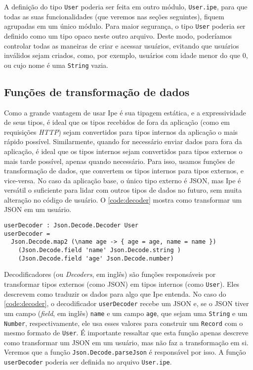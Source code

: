 A definição do tipo \texttt{User} poderia ser feita em outro módulo, \texttt{User.ipe}, para que todas
as suas funcionalidades (que veremos nas seções seguintes), fiquem agrupadas em um único módulo. Para
maior segurança, o tipo \texttt{User} poderia ser definido como um tipo opaco neste outro arquivo.
Deste modo, poderíamos controlar todas as maneiras de criar e acessar usuários, evitando que usuários
inválidos sejam criados, como, por exemplo, usuários com idade menor do que 0, ou cujo nome é uma
\texttt{String} vazia.

\subsection{Funções de transformação de dados}

Como a grande vantagem de usar Ipe é sua tipagem estática, e a expressividade de seus tipos, é ideal
que os tipos recebidos de fora da aplicação (como em requisições \textit{HTTP}) sejam convertidos
para tipos internos da aplicação o mais rápido possível. Similarmente, quando for necessário enviar
dados para fora da aplicação, é ideal que os tipos internos sejam convertidos para tipos externos
o mais tarde possível, apenas quando necessário. Para isso, usamos funções de transformação de dados,
que convertem os tipos internos para tipos externos, e vice-versa. No caso da aplicação base, o único
tipo externo é JSON, mas Ipe é versátil o suficiente para lidar com outros tipos de dados no futuro,
sem muita alteração no código de usuário. O \autoref{code:decoder} mostra como transformar um JSON
em um usuário.

\begin{lstlisting}[label={code:decoder},caption={Função que transforma JSON em um usuário}]
userDecoder : Json.Decode.Decoder User
userDecoder =
  Json.Decode.map2 (\name age -> { age = age, name = name })
    (Json.Decode.field 'name' Json.Decode.string )
    (Json.Decode.field 'age' Json.Decode.number)
\end{lstlisting}

Decodificadores (ou \textit{Decoders}, em inglês) são funções responsáveis por transformar tipos
externos (como JSON) em tipos internos (como \texttt{User}). Eles descrevem como traduzir os dados
para algo que Ipe entenda. No caso do \autoref{code:decoder}, o decodificador \texttt{userDecoder}
recebe um JSON e, se o JSON tiver um campo (\textit{field}, em inglês) \texttt{name} e um campo
\texttt{age}, que sejam uma \texttt{String} e um \texttt{Number}, respectivamente, ele usa esses valores
para construir um \texttt{Record} com o mesmo formato de \texttt{User}. É importante ressaltar que
esta função apenas descreve como transformar um JSON em um usuário, mas não faz a transformação em si.
Veremos que a função \texttt{Json.Decode.parseJson} é responsável por isso. A função \texttt{userDecoder}
poderia ser definida no arquivo \texttt{User.ipe}.

